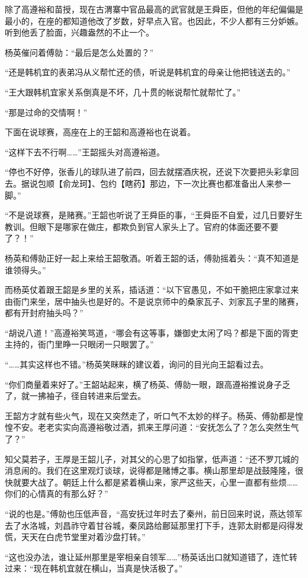 除了高遵裕和苗授，现在古渭寨中官品最高的武官就是王舜臣，但他的年纪偏偏是最小的，在座的都知道他改了岁数，好早点入官。也因此，不少人都有三分妒嫉。听到他丢了脸面，兴趣盎然的不止一个。

杨英催问着傅勍：“最后是怎么处置的？”

“还是韩机宜的表弟冯从义帮忙还的债，听说是韩机宜的母亲让他把钱送去的。”

“王大跟韩机宜家关系倒真是不坏，几十贯的帐说帮忙就帮忙了。”

“那是过命的交情啊！”

下面在说球赛，高座在上的王韶和高遵裕也在说着。

“这样下去不行啊……”王韶摇头对高遵裕道。

“停也不好停，张香儿的球队进了前四，回去就摆酒庆祝，还说下次要把头彩拿回去。据说包顺【俞龙珂】、包约【瞎药】那边，下一次比赛也都准备出人来参一脚。”

“不是说球赛，是赌赛。”王韶也听说了王舜臣的事，“王舜臣不自爱，过几日要好生教训。但眼下是哪家在做庄，都欺负到官人家头上了。官府的体面还要不要了？！”

杨英和傅勍正好一起上来给王韶敬酒。听着王韶的话，傅勍摇着头：“真不知道是谁领得头。”

而杨英仗着跟王韶是乡里的关系，插话道：“以下官愚见，不如干脆把庄家拿过来由衙门来坐，居中抽头也是好的。不是说京师中的桑家瓦子、刘家瓦子里的赌赛，都有开封府抽头吗？”

“胡说八道！”高遵裕笑骂道，“哪会有这等事，嫌御史太闲了吗？都是下面的胥吏主持的，衙门里睁一只眼闭一只眼罢了。”

“……其实这样也不错。”杨英笑眯眯的建议着，询问的目光向王韶看过去。

“你们商量着来好了。”王韶站起来，横了杨英、傅勍一眼，跟高遵裕推说身子乏了，就一拂袖子，径自转进来后堂去。

王韶方才就有些火气，现在又突然走了，听口气不太妙的样子。杨英、傅勍都是惶惶不安。老老实实向高遵裕敬过酒，抓来王厚问道：“安抚怎么了？怎么突然生气了？”

知父莫若子，王厚是王韶儿子，对其父的心思了如指掌，低声道：“还不罗兀城的消息闹的。我们在这里观灯谈球，说得都是赌博之事。横山那里却是战鼓隆隆，很快就要大战了。朝廷上什么都是紧着横山来，家严这些天，心里一直都有些烦……你们的心情真的有那么好？”

“说的也是。”傅勍也压低声音，“高安抚过年时去了秦州，前日回来时说，燕达领军去了水洛城，刘昌祚守着甘谷城，秦凤路给鄜延那里打下手，连郭太尉都是闷得发慌，天天在白虎节堂里对着沙盘打转。”

“这也没办法，谁让延州那里是宰相亲自领军……”杨英话出口就知道错了，连忙转过来：“现在韩机宜就在横山，当真是快活极了。”


